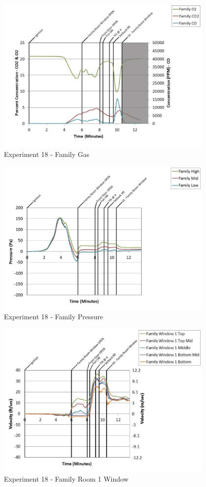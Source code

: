 \documentclass{article}
\begin{document}
\begin{appendices}
	\begin{figure}[h!]
		\centering
		\includegraphics[height=3.05in]{0_Images/Results_Charts/Exp_18_Charts/FamilyGas.pdf}
		\caption{Experiment 18 - Family Gas}
	\end{figure}
 
	\clearpage

	\begin{figure}[h!]
		\centering
		\includegraphics[height=3.05in]{0_Images/Results_Charts/Exp_18_Charts/FamilyPressure.pdf}
		\caption{Experiment 18 - Family Pressure}
	\end{figure}
 

	\begin{figure}[h!]
		\centering
		\includegraphics[height=3.05in]{0_Images/Results_Charts/Exp_18_Charts/FamilyRoom1Window.pdf}
		\caption{Experiment 18 - Family Room 1 Window}
	\end{figure}
 

\end{appendices}
\end{document}
